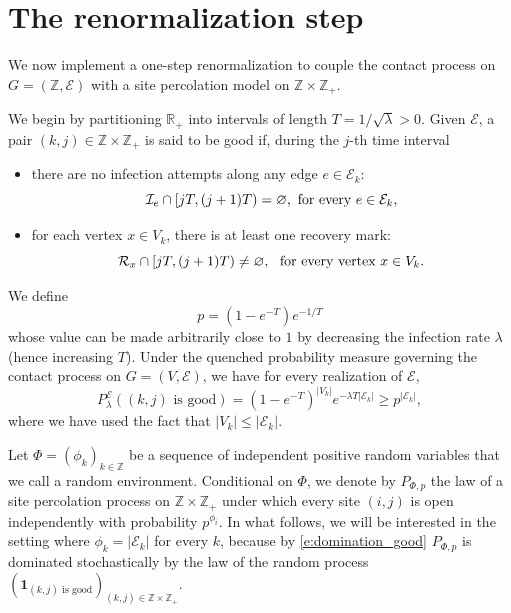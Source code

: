 \documentclass[a4paper,oneside,12pt]{amsart}
\renewcommand{\leq}{\leqslant}
\renewcommand{\geq}{\geqslant}
\theoremstyle{plain}
\theoremstyle{definition}
\theoremstyle{remark}
\newcommand{\Z}{{\mathbb{Z}}}
\begin{document}
\section{The renormalization step}
\label{s:renormalization}

We now implement a one-step renormalization to couple the contact process on \( G = (\mathbb{Z}, \mathcal{E}) \) with a site percolation model on \( \mathbb{Z} \times \mathbb{Z}_+ \).  

We begin by partitioning \( \mathbb{R}_+ \) into intervals of length \( T = 1/{\sqrt{\lambda}} > 0 \).
Given \( \mathcal{E} \), a pair \( (k,j) \in \mathbb{Z} \times \mathbb{Z}_+ \) is said to be good if, during the \( j \)-th time interval
\begin{itemize}
\item there are no infection attempts along any edge \( e \in \mathcal{E}_k \):
\begin{equation*}
\textrm{$\mathcal{I}_e \cap [jT, (j+1)T) = \varnothing$,\, for every $e\in \mathcal{E}_k$},
\end{equation*}
\item for each vertex \( x \in V_k \), there is at least one recovery mark: 
\begin{equation*}
\textrm{$\mathcal{R}_x \cap [jT, (j+1)T) \neq \varnothing$, \, for every vertex $x \in V_k$}.
\end{equation*}
\end{itemize}
We define 
\[
p = (1-  e^{-T})e^{-1/T}
\]
whose value can be made arbitrarily close to $1$ by decreasing the infection rate $\lambda$ (hence increasing $T$).
Under the quenched probability measure governing the contact process on $G=(V,\mathcal{E})$, we have for every realization of $\mathcal{E}$,
\begin{equation}
\label{e:domination_good}
P^{\mathcal{E}}_{\lambda} \left( (k,j) \textrm{ is good}\right) = \left(1 - e^{-T}\right)^{|V_k|}e^{-\lambda T|\mathcal{E}_k|} \geq p^{|\mathcal{E}_k|},
\end{equation}
where we have used the fact that $|V_k| \leq |\mathcal{E}_k|$.

Let $\Phi = (\phi_k)_{k \in \Z}$ be a sequence of independent positive random variables that we call a random environment.
Conditional on $\Phi$, we denote by $P_{\Phi, p}$ the law of a site percolation process on $\mathbb{Z} \times \mathbb{Z}_+$ under which every site $(i,j)$ is open independently with probability $p^{\phi_i}$.
In what follows, we will be interested in the setting where $\phi_k = |\mathcal{E}_k|$ for every $k$, because by \eqref{e:domination_good} $P_{\Phi,p}$ is dominated stochastically by the law of the random process $(\mathbf{1}_{\text{$(k,j)$ is good}})_{(k,j)\in \mathbb{Z}\times \mathbb{Z}_+}$.
\end{document}
